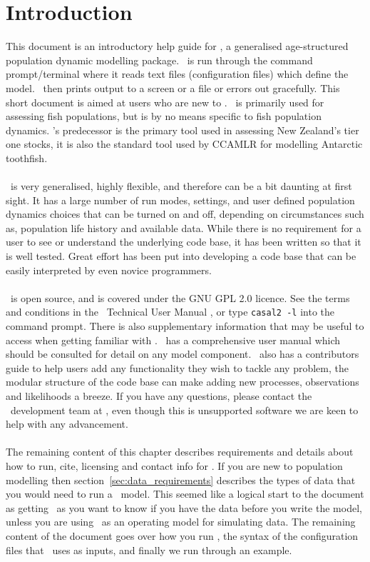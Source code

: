\section{Introduction}\label{sec:introduction}

This document is an introductory help guide for \CNAME, a generalised age-structured population dynamic modelling package. \CNAME\ is run through the command prompt/terminal where it reads text files (configuration files) which define the model. \CNAME\ then prints output to a screen or a file or errors out gracefully. This short document is aimed at users who are new to \CNAME. \CNAME\ is primarily used for assessing fish populations, but is by no means specific to fish population dynamics. \CNAME's predecessor is the primary tool used in assessing New Zealand's tier one stocks, it is also the standard tool used by CCAMLR for modelling Antarctic toothfish. 
\\\\
\CNAME\ is very generalised, highly flexible, and therefore can be a bit daunting at first sight. It has a large number of run modes, settings, and user defined population dynamics choices that can be turned on and off, depending on circumstances such as, population life history and available data. While there is no requirement for a user to see or understand the underlying code base, it has been written so that it is well tested. Great effort has been put into developing a code base that can be easily interpreted by even novice programmers.
\\\\
\CNAME\ is open source, and is covered under the GNU GPL 2.0 licence. See the terms and conditions in the \CNAME\ Technical User Manual \citep{CASAL2}, or type \texttt{casal2 -l} into the command prompt. There is also supplementary information that may be useful to access when getting familiar with \CNAME. \CNAME\ has a comprehensive user manual \citep{CASAL2} which should be consulted for detail on any model component. \CNAME\ also has a contributors guide to help users add any functionality they wish to tackle any problem, the modular structure of the code base can make adding new processes, observations and likelihoods a breeze. If you have any questions, please contact the \CNAME\ development team at \email, even though this is unsupported software we are keen to help with any advancement.
\\\\
The remaining content of this chapter describes requirements and details about how to run, cite, licensing and contact info for \CNAME. If you are new to population modelling then section~\ref{sec:data_requirements} describes the types of data that you would need to run a \CNAME\ model. This seemed like a logical start to the document as getting \CNAME\ as you want to know if you have the data before you write the model, unless you are using \CNAME\ as an operating model for simulating data. 
The remaining content of the document goes over how you run \CNAME, the syntax of the configuration files that \CNAME\ uses as inputs, and finally we run through an example.
\\\\
